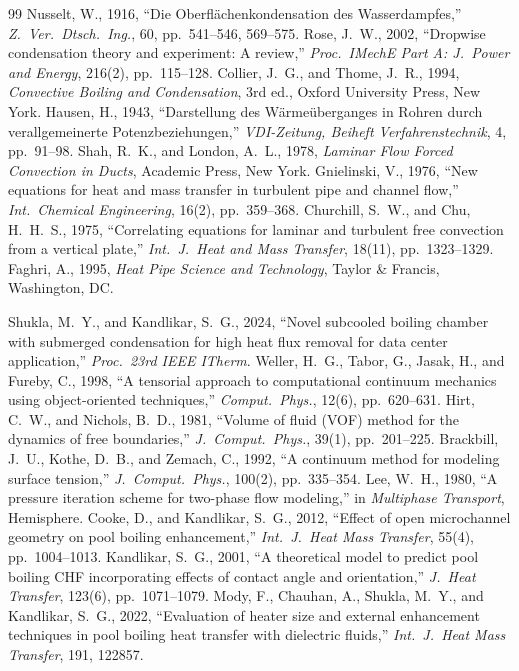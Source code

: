 \documentclass[11pt]{article}
\begin{document}
\begin{thebibliography}{99}
 Nusselt, W., 1916, ``Die Oberfl\"achenkondensation des Wasserdampfes,'' \textit{Z.\ Ver.\ Dtsch.\ Ing.}, 60, pp.~541--546, 569--575.
 Rose, J.~W., 2002, ``Dropwise condensation theory and experiment: A review,'' \textit{Proc.\ IMechE Part A: J.\ Power and Energy}, 216(2), pp.~115--128.
 Collier, J.~G., and Thome, J.~R., 1994, \textit{Convective Boiling and Condensation}, 3rd ed., Oxford University Press, New York.
 Hausen, H., 1943, ``Darstellung des W\"arme\"uberganges in Rohren durch verallgemeinerte Potenzbeziehungen,'' \textit{VDI-Zeitung, Beiheft Verfahrenstechnik}, 4, pp.~91--98.
 Shah, R.~K., and London, A.~L., 1978, \textit{Laminar Flow Forced Convection in Ducts}, Academic Press, New York.
 Gnielinski, V., 1976, ``New equations for heat and mass transfer in turbulent pipe and channel flow,'' \textit{Int.\ Chemical Engineering}, 16(2), pp.~359--368.
 Churchill, S.~W., and Chu, H.~H.~S., 1975, ``Correlating equations for laminar and turbulent free convection from a vertical plate,'' \textit{Int.\ J.\ Heat and Mass Transfer}, 18(11), pp.~1323--1329.
 Faghri, A., 1995, \textit{Heat Pipe Science and Technology}, Taylor \& Francis, Washington, DC.

 Shukla, M.~Y., and Kandlikar, S.~G., 2024, ``Novel subcooled boiling
chamber with submerged condensation for high heat flux removal for data center
application,'' \textit{Proc.\ 23rd IEEE ITherm}.
 Weller, H.~G., Tabor, G., Jasak, H., and Fureby, C., 1998, ``A
tensorial approach to computational continuum mechanics using object-oriented
techniques,'' \textit{Comput.\ Phys.}, 12(6), pp.~620--631.
 Hirt, C.~W., and Nichols, B.~D., 1981, ``Volume of fluid (VOF) method
for the dynamics of free boundaries,'' \textit{J.\ Comput.\ Phys.}, 39(1), pp.~201--225.
 Brackbill, J.~U., Kothe, D.~B., and Zemach, C., 1992, ``A continuum
method for modeling surface tension,'' \textit{J.\ Comput.\ Phys.}, 100(2), pp.~335--354.
 Lee, W.~H., 1980, ``A pressure iteration scheme for two-phase flow
modeling,'' in \textit{Multiphase Transport}, Hemisphere.
 Cooke, D., and Kandlikar, S.~G., 2012, ``Effect of open microchannel
geometry on pool boiling enhancement,'' \textit{Int.\ J.\ Heat Mass Transfer}, 55(4),
pp.~1004--1013.
 Kandlikar, S.~G., 2001, ``A theoretical model to predict pool
boiling CHF incorporating effects of contact angle and orientation,'' \textit{J.\ Heat
Transfer}, 123(6), pp.~1071--1079.
 Mody, F., Chauhan, A., Shukla, M.~Y., and Kandlikar, S.~G., 2022,
``Evaluation of heater size and external enhancement techniques in pool boiling heat
transfer with dielectric fluids,'' \textit{Int.\ J.\ Heat Mass Transfer}, 191, 122857.

\end{thebibliography}
\end{document}
